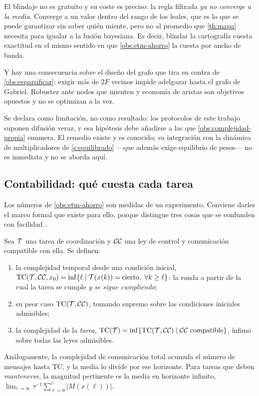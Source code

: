 \begin{observacion}
\label{obs:resiliente-precio}
El blindaje no es gratuito y su coste es preciso: la regla filtrada \emph{ya no
converge a la media}. Converge a un valor dentro del rango de los leales, que es
lo que se puede garantizar sin saber quién miente, pero no al promedio que
\cref{th:mapa} necesita para igualar a la fusión bayesiana. Es decir, blindar la
cartografía cuesta exactitud en el mismo sentido en que
\cref{obs:etm-ahorro} la cuesta por ancho de banda.

Y hay una consecuencia sobre el diseño del grafo que tira en contra de
\cref{obs:esparsificar}: exigir más de $2F$ vecinos impide adelgazar hasta el
grafo de Gabriel. Robustez ante nodos que mienten y economía de aristas son
objetivos opuestos y no se optimizan a la vez.

Se declara como limitación, no como resultado: los protocolos de este trabajo
suponen difusión veraz, y esa hipótesis debe añadirse a las que
\cref{obs:complejidad-propia} enumera. El remedio existe y es conocido; su
integración con la dinámica de multiplicadores de \cref{s:equilibrado} —que
además exige equilibrio de pesos— no es inmediata y no se aborda aquí.
\end{observacion}

\subsection{Contabilidad: qué cuesta cada tarea}

Los números de \cref{obs:etm-ahorro} son medidas de un experimento. Conviene
darles el marco formal que existe para ello, porque distingue tres cosas que se
confunden con facilidad \cite{bullo2009distributed}.

\begin{definicion}
\label{def:complejidad}
Sea $\mathcal{T}$ una tarea de coordinación y $\mathcal{C}\mathcal{C}$ una ley de control y
comunicación compatible con ella. Se definen:
\begin{enumerate}[label=(\roman*),leftmargin=2.2em,topsep=0.2em,itemsep=0.15em]
  \item la complejidad temporal desde una condición inicial,
  $\mathrm{TC}(\mathcal{T},\mathcal{C}\mathcal{C},x_0)=\inf\{\ell\mid
  \mathcal{T}(x(k))=\text{cierto},\ \forall k\ge\ell\}$: la ronda a partir de la cual
  la tarea se cumple \emph{y se sigue cumpliendo};
  \item su peor caso $\mathrm{TC}(\mathcal{T},\mathcal{C}\mathcal{C})$, tomando supremo sobre las
  condiciones iniciales admisibles;
  \item la complejidad de la \emph{tarea},
  $\mathrm{TC}(\mathcal{T})=\inf\{\mathrm{TC}(\mathcal{T},\mathcal{C}\mathcal{C})\mid \mathcal{C}\mathcal{C}
  \text{ compatible}\}$, ínfimo sobre todas las leyes admisibles.
\end{enumerate}
Análogamente, la complejidad de comunicación total acumula el número de mensajes
hasta $\mathrm{TC}$, y la media lo divide por ese horizonte. Para tareas que
deben \emph{mantenerse}, la magnitud pertinente es la media en horizonte
infinito, $\lim_{\tau\to\infty}\tau^{-1}\sum_{\ell=0}^{\tau}|M(x(\ell))|$.
\end{definicion}


